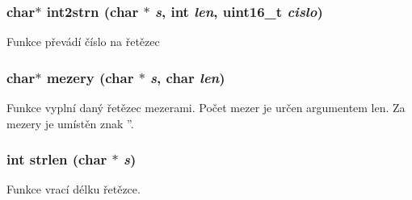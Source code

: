 \subsubsection[{int2strn}]{\setlength{\rightskip}{0pt plus 5cm}char$\ast$ int2strn (char $\ast$ {\em s}, \/  int {\em len}, \/  uint16\_\-t {\em cislo})}\label{convert_8c_a17bf3fd114d2e811eb0193d03398cf7a}
Funkce převádí číslo na řetězec 
\subsubsection[{mezery}]{\setlength{\rightskip}{0pt plus 5cm}char$\ast$ mezery (char $\ast$ {\em s}, \/  char {\em len})}\label{convert_8c_a39b535915350e4ef7042813898302441}
Funkce vyplní daný řetězec mezerami. Počet mezer je určen argumentem len. Za mezery je umístěn znak ''. 
\subsubsection[{strlen}]{\setlength{\rightskip}{0pt plus 5cm}int strlen (char $\ast$ {\em s})}\label{convert_8c_aae9bab51ad4377373a2d4e9f7bbf0f2e}


Funkce vrací délku řetězce. 